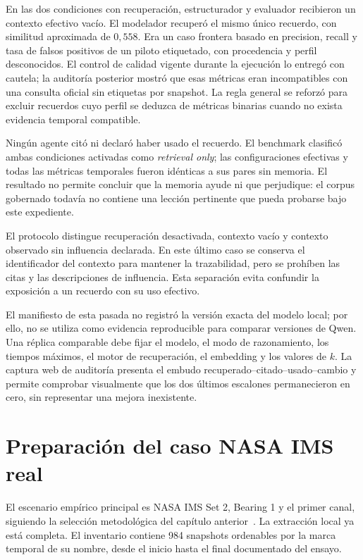 En las dos condiciones con recuperación, estructurador y evaluador recibieron
un contexto efectivo vacío. El modelador recuperó el mismo único recuerdo,
con similitud aproximada de $0{,}558$. Era un caso frontera basado en precision,
recall y tasa de falsos positivos de un piloto etiquetado, con procedencia y
perfil desconocidos. El control de calidad vigente durante la ejecución lo
entregó con cautela; la auditoría posterior mostró que esas métricas eran incompatibles con
una consulta oficial sin etiquetas por snapshot. La regla general se reforzó
para excluir recuerdos cuyo perfil se deduzca de métricas binarias cuando no
exista evidencia temporal compatible.

Ningún agente citó ni declaró haber usado el recuerdo. El benchmark clasificó
ambas condiciones activadas como \emph{retrieval only}; las configuraciones
efectivas y todas las métricas temporales fueron idénticas a sus pares sin
memoria. El resultado no permite concluir que la memoria ayude ni que perjudique:
el corpus gobernado todavía no contiene una lección pertinente que pueda
probarse bajo este expediente.

El protocolo distingue recuperación desactivada, contexto vacío y contexto
observado sin influencia declarada. En este último caso se conserva el
identificador del contexto para mantener la trazabilidad, pero se prohíben las
citas y las descripciones de influencia. Esta separación evita confundir la
exposición a un recuerdo con su uso efectivo.

El manifiesto de esta pasada no registró la versión exacta del modelo local; por
ello, no se utiliza como evidencia reproducible para comparar versiones de
Qwen. Una réplica comparable debe fijar el modelo, el modo de razonamiento, los
tiempos máximos, el motor de recuperación, el embedding y los valores de $k$.
La captura web de auditoría presenta el embudo
recuperado--citado--usado--cambio y permite comprobar visualmente que los dos
últimos escalones permanecieron en cero, sin representar una mejora inexistente.

\section{Preparación del caso NASA IMS real}

El escenario empírico principal es NASA IMS Set 2, Bearing 1 y el primer
canal, siguiendo la selección metodológica del capítulo
anterior~\cite{nasa_pcoe_repository,nasa_ims_bearings_zip}. La extracción local ya está
completa. El inventario contiene 984 snapshots ordenables por la marca temporal
de su nombre, desde el inicio hasta el final documentado del ensayo.

